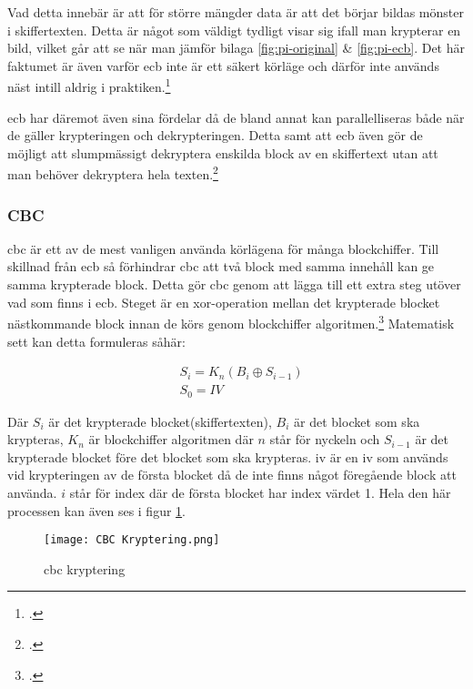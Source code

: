 Vad detta innebär är att för större mängder data
är att det börjar bildas mönster i skiffertexten. Detta är något som väldigt
tydligt visar sig ifall man krypterar en bild, vilket går att se när man jämför
bilaga \ref{fig:pi-original} \& \ref{fig:pi-ecb}.
Det här faktumet är även varför \acrshort{ecb} inte är ett säkert körläge
och därför inte används näst intill aldrig i praktiken.\footcite{dworkin2001sp}

\acrshort{ecb} har däremot även sina fördelar då de bland annat kan parallelliseras
både när de gäller krypteringen och dekrypteringen. Detta samt att \acrshort{ecb}
även gör de möjligt att slumpmässigt dekryptera enskilda block av en skiffertext
utan att man behöver dekryptera hela texten.\footcite{dworkin2001sp}

\subsubsection{CBC}
\label{sec:cbc}
\acrlong{cbc} är ett av de mest vanligen använda körlägena för många blockchiffer.
Till skillnad från \acrshort{ecb} så förhindrar \acrshort{cbc} att två block med
samma innehåll kan ge samma krypterade block. Detta gör \acrshort{cbc} genom att
lägga till ett extra steg utöver vad som finns i \acrshort{ecb}. Steget
är en \gls{xor}-operation mellan det krypterade blocket nästkommande block innan
de körs genom blockchiffer algoritmen.\footcite{dworkin2001sp}
Matematisk sett kan detta formuleras såhär:

\begin{equation}
    \label{eq:cbc-encryption}
    \begin{aligned}
        &S_i = K_n(B_i \oplus S_{i-1})\\\nonumber
        &S_0 = IV
    \end{aligned}
\end{equation}

Där $S_i$ är det krypterade blocket(skiffertexten), $B_i$ är det blocket som ska krypteras,
$K_n$ är blockchiffer algoritmen där $n$ står för nyckeln och $S_{i-1}$ är
det krypterade blocket före det blocket som ska krypteras. \acrshort{iv} är en
\acrfull{iv} som används vid krypteringen av de första blocket då de inte finns
något föregående block att använda. $i$ står för index där de första blocket har
index värdet 1. Hela den här processen kan även ses i figur \ref{fig:cbc-mode-enc}.

\begin{figure}[H]
    \texttt{[image: CBC Kryptering.png]}
    \caption{\acrlong{cbc} kryptering}
    \label{fig:cbc-mode-enc}
\end{figure}

